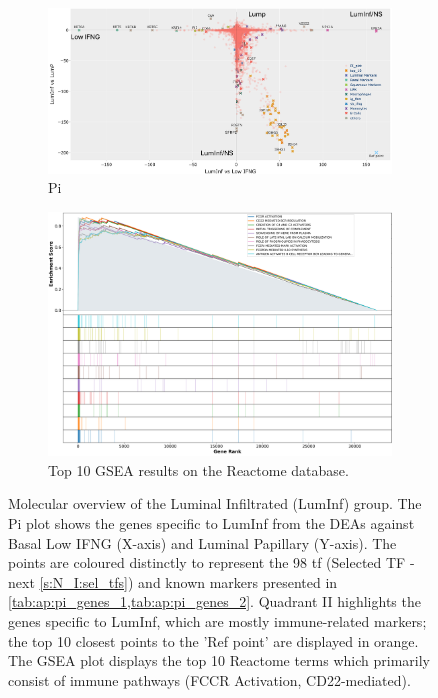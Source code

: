 \begin{figure}[H]
    \centering
    \captionsetup{font=small} 
    \begin{subfigure}[!t]{1.0\textwidth}
        \includegraphics[width=\textwidth,keepaspectratio]{Sections/ClusteringAnalysis/Resources/discussion/other_groups/lumInf_pi.png}
        \caption{Pi}
        \label{fig:cs:lumInf_pi}
    \end{subfigure}
    \centering
    \begin{subfigure}[!t]{0.9\textwidth}
        \includegraphics[width=\textwidth, keepaspectratio]{Sections/ClusteringAnalysis/Resources/discussion/other_groups/lumInf_reactome_10_top.png}
        \caption{Top 10 GSEA results on the Reactome database.}
        \label{fig:cs:lumInf_gsea}
    \end{subfigure} 
    \centering
    \caption[LumInf-like - molecular overview]{Molecular overview of the Luminal Infiltrated (LumInf) group. The Pi plot shows the genes specific to LumInf from the DEAs against Basal Low IFNG (X-axis) and Luminal Papillary (Y-axis). The points are coloured distinctly to represent the 98 \acrlong{tf} (Selected TF - next \cref{s:N_I:sel_tfs}) and known markers presented in \cref{tab:ap:pi_genes_1,tab:ap:pi_genes_2}. Quadrant II highlights the genes specific to LumInf, which are mostly immune-related markers; the top 10 closest points to the 'Ref point' are displayed in orange. The GSEA plot displays the top 10 Reactome terms which primarily consist of immune pathways (FCCR Activation, CD22-mediated).}
    \label{fig:cs:lumInf}
\end{figure}


